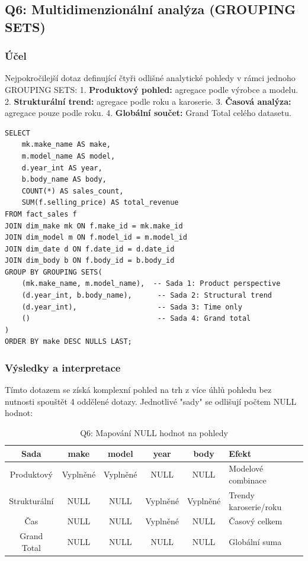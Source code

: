 \documentclass[12pt,a4paper]{article}
\begin{document}
\subsection{Q6: Multidimenzionální analýza (GROUPING SETS)}

\subsubsection{Účel}

Nejpokročilejší dotaz definující čtyři odlišné analytické pohledy v rámci jednoho GROUPING SETS:
1. \textbf{Produktový pohled:} agregace podle výrobce a modelu.
2. \textbf{Strukturální trend:} agregace podle roku a karoserie.
3. \textbf{Časová analýza:} agregace pouze podle roku.
4. \textbf{Globální součet:} Grand Total celého datasetu.

\begin{lstlisting}[caption=Q6: GROUPING SETS – 4 pohledy]
SELECT 
    mk.make_name AS make,
    m.model_name AS model,
    d.year_int AS year,
    b.body_name AS body,
    COUNT(*) AS sales_count,
    SUM(f.selling_price) AS total_revenue
FROM fact_sales f
JOIN dim_make mk ON f.make_id = mk.make_id
JOIN dim_model m ON f.model_id = m.model_id
JOIN dim_date d ON f.date_id = d.date_id
JOIN dim_body b ON f.body_id = b.body_id
GROUP BY GROUPING SETS(
    (mk.make_name, m.model_name),  -- Sada 1: Product perspective
    (d.year_int, b.body_name),      -- Sada 2: Structural trend
    (d.year_int),                   -- Sada 3: Time only
    ()                              -- Sada 4: Grand total
)
ORDER BY make DESC NULLS LAST;
\end{lstlisting}

\subsubsection{Výsledky a interpretace}

Tímto dotazem se získá komplexní pohled na trh z více úhlů pohledu bez nutnosti spouštět
4 oddělené dotazy. Jednotlivé "sady" se odlišují počtem NULL hodnot:

\begin{table}[H]
    \centering
    \small
    \begin{tabular}{|c|c|c|c|c|}
        \hline
        \textbf{Sada} & \textbf{make} & \textbf{model} & \textbf{year} & \textbf{body} & \textbf{Efekt} \\
        \hline
        Produktový & Vyplněné & Vyplněné & NULL & NULL & Modelové combinace \\
        Strukturální & NULL & NULL & Vyplněné & Vyplněné & Trendy karoserie/roku \\
        Čas & NULL & NULL & Vyplněné & NULL & Časový celkem \\
        Grand Total & NULL & NULL & NULL & NULL & Globální suma \\
        \hline
    \end{tabular}
    \caption{Q6: Mapování NULL hodnot na pohledy}
\end{table}
\end{document}
